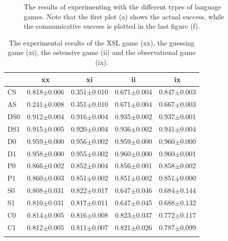 \begin{figure}[t]
\centering
{}
\caption{The results of experimenting with the different types of language games. Note that the first plot (a) shows the actual success, while the communicative success is plotted in the last figure (f).}
\label{f:par:feedback}
\end{figure}


\begin{table}
\centering
\begin{tabular}{lcccc}
\lsptoprule
&     {\bf xx}&        {\bf xi}&               {\bf ii}&         {\bf ix}       \\\midrule
CS&   0.818$\pm$0.006& 0.351$\pm$0.010&        0.671$\pm$0.004&  0.847$\pm$0.003\\%
AS&   0.241$\pm$0.008& 0.351$\pm$0.010&        0.671$\pm$0.004&  0.667$\pm$0.003\\%
DS0&  0.912$\pm$0.004& 0.916$\pm$0.004&        0.935$\pm$0.002&  0.937$\pm$0.001\\%
DS1&  0.915$\pm$0.005& 0.920$\pm$0.004&        0.936$\pm$0.002&  0.941$\pm$0.004\\%
D0&   0.959$\pm$0.000& 0.956$\pm$0.002&        0.959$\pm$0.000&  0.960$\pm$0.000\\%
D1&   0.958$\pm$0.000& 0.955$\pm$0.002&        0.960$\pm$0.000&  0.960$\pm$0.001\\%
P0&   0.866$\pm$0.002& 0.852$\pm$0.004&        0.856$\pm$0.001&  0.858$\pm$0.002\\%
P1&   0.860$\pm$0.003& 0.851$\pm$0.002&        0.851$\pm$0.002&  0.851$\pm$0.000\\%
S0&   0.808$\pm$0.031& 0.822$\pm$0.017&        0.647$\pm$0.046&  0.684$\pm$0.144\\%
S1&   0.810$\pm$0.031& 0.817$\pm$0.011&        0.647$\pm$0.045&  0.688$\pm$0.132\\%
C0&   0.814$\pm$0.005& 0.816$\pm$0.008&        0.823$\pm$0.037&  0.772$\pm$0.117\\%
C1&   0.812$\pm$0.005& 0.811$\pm$0.007&        0.821$\pm$0.026&  0.787$\pm$0.099\\%
\lspbottomrule
\end{tabular}
\caption{The experimental results of the XSL game (xx), the guessing game (xi), the ostensive game (ii) and the observational game (ix).}
\label{t:par:feedback}
\end{table}

